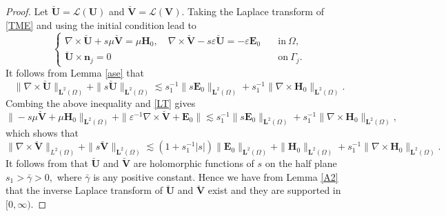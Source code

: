 \documentclass[11pt,reqno]{amsart}
\numberwithin{equation}{section}
\begin{document}
 \begin{proof}
Let $\breve {\boldsymbol U} =\mathscr L (\boldsymbol U)$ and $\breve
{\boldsymbol V}=\mathscr L (\boldsymbol V)$. Taking the Laplace transform of
\eqref{TME} and using the initial condition lead to
 \begin{equation}\label{LT}
 \left\{
 \begin{array}{ll}
 \nabla \times  \breve {\boldsymbol U} + s \mu \breve {\boldsymbol V} =\mu
\boldsymbol H_0, \quad \nabla \times \breve {\boldsymbol V} - s \varepsilon
\breve {\boldsymbol U}= - \varepsilon \boldsymbol E_0 \quad &\text{in}
~\Omega,\\
\breve {\boldsymbol U} \times \boldsymbol n_j =0 \quad &\text{on} ~ \Gamma_j.
 \end{array}
 \right.
 \end{equation}
 It follows from Lemma \ref{ase} that
 \[
\|\nabla \times \breve {\boldsymbol U}\|_{\boldsymbol L^2 (\Omega)} +\|s  \breve
{\boldsymbol U}\|_{\boldsymbol L^2 (\Omega)}\lesssim  s_1 ^{-1} \| s \boldsymbol
E_0\|_{\boldsymbol L^2 (\Omega)} + s_1^{-1} \|\nabla \times \boldsymbol
H_0\|_{\boldsymbol L^2 (\Omega)}. 
\]
Combing the above inequality and \eqref{LT} gives
\[
\|-s \mu \breve {\boldsymbol V} +\mu \boldsymbol H_0\|_{\boldsymbol L^2
(\Omega)} +\| \varepsilon ^{-1} \nabla \times \breve {\boldsymbol V} +
\boldsymbol E_0\| \lesssim  s_1 ^{-1} \| s \boldsymbol E_0\|_{\boldsymbol L^2
(\Omega)} + s_1^{-1} \|\nabla \times \boldsymbol H_0\|_{\boldsymbol L^2
(\Omega)}, 
\]
which shows that 
\[
\|\nabla \times {\breve {\boldsymbol V}}\|_{L^2 (\Omega)} +\| s \breve
{\boldsymbol V}\|_{\boldsymbol L^2 (\Omega)} \lesssim (1+s_1 ^{-1} |s|)
\|\boldsymbol E_0\|_{\boldsymbol L^2 (\Omega)} + \|\boldsymbol
H_0\|_{\boldsymbol L^2 (\Omega)} +s_1^{-1} \|\nabla \times \boldsymbol
H_0\|_{\boldsymbol L^2 (\Omega)}.
\]
It follows from \cite[Lemma 44.1]{Treves1975} that $\breve { \boldsymbol U}$ and
$\breve {\boldsymbol V}$ are holomorphic functions of $s$ on the half plane $s_1
>\bar\gamma>0,$  where $\bar \gamma$ is any positive constant. Hence we have
from Lemma \ref{A2} that the inverse Laplace transform of $\breve { \boldsymbol
U}$ and $\breve {\boldsymbol V}$ exist and they are  supported in $[0, \infty).$


\end{proof}
\end{document}
